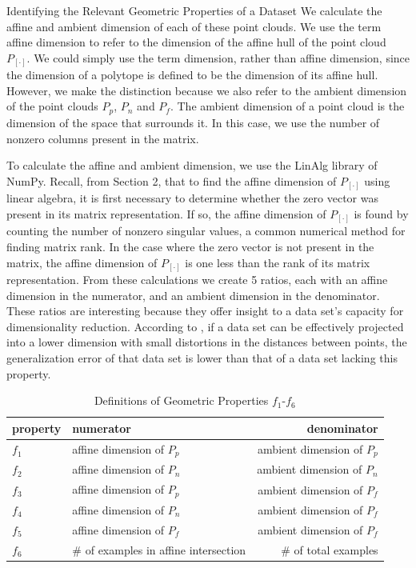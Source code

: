\documentclass{llncs}
\begin{document}
\begin{section}{Identifying the Relevant Geometric Properties of a Dataset}
We calculate the affine and ambient dimension of each of these point clouds. We use the term affine dimension to refer to the dimension of the affine hull of the point cloud $P_{[\cdot]}$. We could simply use the term dimension, rather than affine dimension, since the dimension of a polytope is defined to be the dimension of its affine hull\cite{Gallier}. However, we make the distinction because we also refer to the ambient dimension of the point clouds $P_p$, $P_n$ and $P_f$.  The ambient dimension of a point cloud is the dimension of the space that surrounds it. In this case, we use the number of nonzero columns present in the matrix.


To calculate the affine and ambient dimension, we use the LinAlg library of NumPy\cite{numpy}. Recall, from Section 2, that to find the affine dimension of $P_{[\cdot]}$ using linear algebra, it is first necessary to determine whether the zero vector was present in its matrix representation. If so, the affine dimension of $P_{[\cdot]}$ is found by counting the number of nonzero singular values, a common numerical method for finding matrix rank\cite{numR}. In the case where the zero vector is not present in the matrix, the affine dimension of $P_{[\cdot]}$ is one less than the rank of its matrix representation. From these calculations we create 5 ratios, each with an affine dimension in the numerator, and an ambient dimension in the denominator. These ratios are interesting because they offer insight to a data set's capacity for dimensionality reduction. According to \cite{Bradley}\cite{Garg}, if a data set can be effectively projected into a lower dimension with small distortions in the distances between points, the generalization error of that data set is lower than that of a data set lacking this property. 
\begin{table}[ht]
\centering
\caption{Definitions of Geometric Properties $f_1$-$f_6$}
\begin{tabular}{l l r }
\hline \hline
property&numerator&denominator \\
\hline

$f_1$&affine dimension of $P_p$& ambient dimension of $P_p$\\
$f_2$&affine dimension of $P_n$& ambient dimension of $P_n$\\
$f_3$&affine dimension of $P_p$& ambient dimension of $P_f$\\
$f_4$&affine dimension of $P_n$& ambient dimension of $P_f$\\
$f_5$&affine dimension of $P_f$& ambient dimension of $P_f$\\
$f_6$&\# of examples in affine intersection   &\# of total examples\\
\hline
\end{tabular}
\label{tab:formulas}
\end{table}



\end{section}
\end{document}
